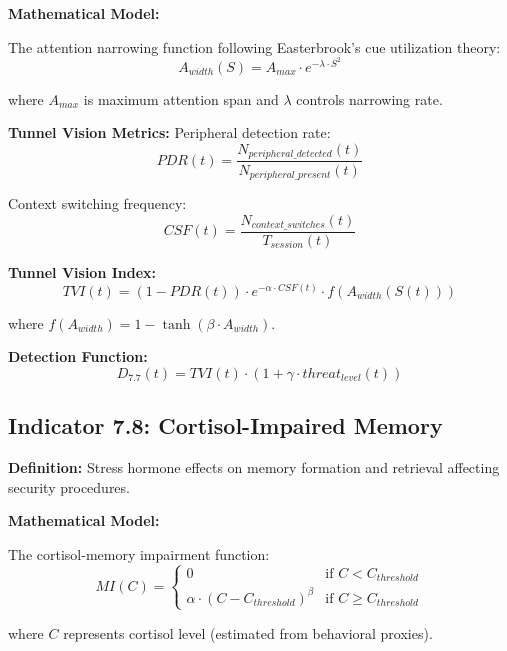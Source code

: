 \documentclass[11pt,a4paper]{article}
\begin{document}
\textbf{Mathematical Model:}

The attention narrowing function following Easterbrook's cue utilization theory:
\begin{equation}
A_{width}(S) = A_{max} \cdot e^{-\lambda \cdot S^2}
\end{equation}

where $A_{max}$ is maximum attention span and $\lambda$ controls narrowing rate.

\textbf{Tunnel Vision Metrics:}
Peripheral detection rate:
\begin{equation}
PDR(t) = \frac{N_{peripheral\_detected}(t)}{N_{peripheral\_present}(t)}
\end{equation}

Context switching frequency:
\begin{equation}
CSF(t) = \frac{N_{context\_switches}(t)}{T_{session}(t)}
\end{equation}

\textbf{Tunnel Vision Index:}
\begin{equation}
TVI(t) = (1 - PDR(t)) \cdot e^{-\alpha \cdot CSF(t)} \cdot f(A_{width}(S(t)))
\end{equation}

where $f(A_{width}) = 1 - \tanh(\beta \cdot A_{width})$.

\textbf{Detection Function:}
\begin{equation}
D_{7.7}(t) = TVI(t) \cdot \left(1 + \gamma \cdot threat_{level}(t)\right)
\end{equation}

\subsection{Indicator 7.8: Cortisol-Impaired Memory}

\textbf{Definition:} Stress hormone effects on memory formation and retrieval affecting security procedures.

\textbf{Mathematical Model:}

The cortisol-memory impairment function:
\begin{equation}
MI(C) = \begin{cases}
0 & \text{if } C < C_{threshold} \\
\alpha \cdot (C - C_{threshold})^{\beta} & \text{if } C \geq C_{threshold}
\end{cases}
\end{equation}

where $C$ represents cortisol level (estimated from behavioral proxies).
\end{document}

